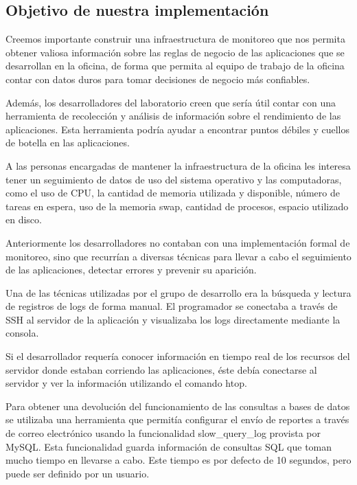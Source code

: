 \subsection{Objetivo de nuestra implementación}
\label{objetivos_de_nuestra_implementacion}

Creemos importante construir una infraestructura de monitoreo que nos permita
obtener valiosa información sobre las reglas de negocio de las aplicaciones que
se desarrollan en la oficina, de forma que permita al equipo de trabajo de la
oficina contar con datos duros para tomar decisiones de negocio más confiables.

Además, los desarrolladores del laboratorio creen que sería útil contar con una
herramienta de recolección y análisis de información sobre el rendimiento de
las aplicaciones. Esta herramienta podría ayudar a encontrar puntos débiles y
cuellos de botella en las aplicaciones.

A las personas encargadas de mantener la infraestructura de la oficina les
interesa tener un seguimiento de datos de uso del sistema operativo y las
computadoras, como el uso de CPU, la cantidad de memoria utilizada y
disponible, número de tareas en espera, uso de la memoria swap, cantidad de
procesos, espacio utilizado en disco.

Anteriormente los desarrolladores no contaban con una implementación formal de
monitoreo, sino que recurrían a diversas técnicas para llevar a cabo el
seguimiento de las aplicaciones, detectar errores y prevenir su aparición.

Una de las técnicas utilizadas por el grupo de desarrollo era la búsqueda y
lectura de registros de logs de forma manual. El programador se conectaba a
través de SSH al servidor de la aplicación y visualizaba los logs directamente
mediante la consola.

Si el desarrollador requería conocer información en tiempo real de los recursos
del servidor donde estaban corriendo las aplicaciones, éste debía conectarse al
servidor y ver la información utilizando el comando htop.

Para obtener una devolución del funcionamiento de las consultas a bases de
datos se utilizaba una herramienta que permitía configurar el envío de reportes
a través de correo electrónico usando la funcionalidad slow\_query\_log
provista por MySQL. Esta funcionalidad guarda información de consultas SQL que
toman mucho tiempo en llevarse a cabo. Este tiempo es por defecto de 10
segundos, pero puede ser definido por un usuario.

